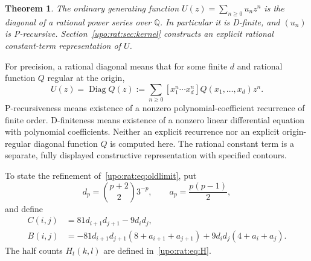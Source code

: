 \documentclass[11pt,letterpaper]{article}
\newtheorem{theorem}{Theorem}[section]
\theoremstyle{remark}\newtheorem{remark}[theorem]{Remark}
\numberwithin{equation}{section}
\newcommand{\Diag}{\operatorname{Diag}}
\begin{document}
\begin{theorem}\label{upo:rat:thm:structure}
The ordinary generating function $U(z)=\sum_{n\ge0}u_nz^n$ is the
diagonal of a rational power series over $\mathbb Q$. In particular it
is D-finite, and $(u_n)$ is P-recursive. Section~\ref{upo:rat:sec:kernel}
constructs an explicit rational constant-term representation of $U$.
\end{theorem}
For precision, a rational diagonal means that for some finite $d$ and
rational function $Q$ regular at the origin,
\[
U(z)=\Diag Q(z):=\sum_{n\ge0}
[x_1^n\cdots x_d^n]Q(x_1,\ldots,x_d)z^n.
\]
P-recursiveness means existence of a nonzero polynomial-coefficient
recurrence of finite order. D-finiteness means existence of a nonzero
linear differential equation with polynomial coefficients.
Neither an explicit recurrence nor an explicit origin-regular diagonal
function $Q$ is computed here. The rational constant term is a separate,
fully displayed constructive representation with specified contours.

To state the refinement of~\eqref{upo:rat:eq:oldlimit}, put
\begin{equation}\label{upo:rat:eq:da}
d_p=\binom{p+2}{2}3^{-p},\qquad a_p=\frac{p(p-1)}2,
\end{equation}
and define
\begin{align}
C(i,j)&=81d_{i+1}d_{j+1}-9d_id_j,\label{upo:rat:eq:C}\\
B(i,j)&=-81d_{i+1}d_{j+1}(8+a_{i+1}+a_{j+1})
       +9d_id_j(4+a_i+a_j).\label{upo:rat:eq:B}
\end{align}
The half counts $H_t(k,l)$ are defined in~\eqref{upo:rat:eq:H}.
\end{document}

